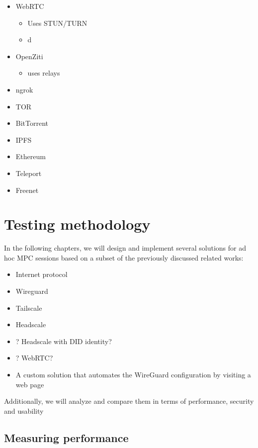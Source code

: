 \begin{itemize}
\tightlist
\item
  WebRTC

  \begin{itemize}
  \tightlist
  \item
    Uses STUN/TURN
  \item
    d
  \end{itemize}
\item
  OpenZiti

  \begin{itemize}
  \tightlist
  \item
    uses relays
  \end{itemize}
\item
  ngrok
\item
  TOR
\item
  BitTorrent
\item
  IPFS
\item
  Ethereum
\item
  Teleport
\item
  Freenet
\end{itemize}

\hypertarget{thesis__030-methods.md}{}
\hypertarget{thesis__030-methods.md__testing-methodology}{%
\chapter{Testing
methodology}\label{thesis__030-methods.md__testing-methodology}}

In the following chapters, we will design and implement several
solutions for ad hoc MPC sessions based on a subset of the previously
discussed related works:

\begin{itemize}
\tightlist
\item
  Internet protocol
\item
  Wireguard
\item
  Tailscale
\item
  Headscale
\item
  ? Headscale with DID identity?
\item
  ? WebRTC?
\item
  A custom solution that automates the WireGuard configuration by
  visiting a web page
\end{itemize}

Additionally, we will analyze and compare them in terms of performance,
security and usability

\hypertarget{thesis__030-methods.md__measuring-performance}{%
\section{Measuring
performance}\label{thesis__030-methods.md__measuring-performance}}

